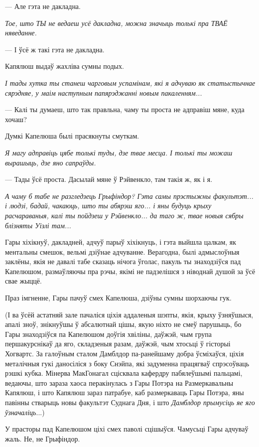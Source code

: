 --- Але гэта не дакладна.

\emph{Тое, што ТЫ не ведаеш усё дакладна, можна значыць толькі пра ТВАЁ
няведанне.}

--- І ўсё ж такі гэта не дакладна.

Капялюш выдаў жахліва сумны подых.

\emph{І тады хутка ты станеш чарговым успамінам, які я адчуваю як статыстычнае
сярэдняе, у маім наступным папярэджанні новым пакаленням...}

--- Калі ты думаеш, што так правльна, чаму ты проста не адправіш мяне, куда хочаш?

Думкі Капелюша былі прасякнуты смуткам.

\emph{Я магу адправіць цябе толькі туды, дзе твае месца. І толькі ты можаш вырашыць, дзе
яно сапраўды.}

--- Тады ўсё проста. Дасылай мяне ў Рэйвенкло, там такія ж, як і я.

\emph{А чаму б табе не разгледзець Грыфіндор? Гэта самы прэстыжны факультэт...
і людзі, бадай, чакаюць, што ты абярэш яго... і яны будуць крыху расчараваныя, 
калі ты пойдзеш у   Рэйвенкло... да таго ж, твае новыя сябры блізняты Уізлі там...}

Гары хіхікнуў, дакладней, адчуў парыў хіхікнуць, і гэта выйшла цалкам, як 
ментальны смешок, вельмі дзіўнае адчуванне. Верагодна, былі адмыслоўныя заклёны,
якія не давалі табе сказаць нічога ўголас, пакуль ты знаходзіўся пад Капелюшом,
размаўляючы пра рэчы, якімі не падзелішся з ніводнай душой за ўсё свае жыццё.

Праз імгненне, Гары пачуў смех Капелюша, дзіўны сумны шорхаючы гук.

(І ва ўсёй астатняй зале пачаліся ціхія аддаленыя шэпты,
якія, крыху ўзняўшыся, апалі зноў, знікнуўшы ў абсалютнай цішы, якую ніхто 
не смеў парушыць, бо Гары знаходзіўся па Капелюшом доўгія хвіліны, даўжэй,
чым група першакурснікаў да яго, складзеныя разам, даўжэй, чым хтосьці ў 
гісторыі Хогвартс. За галоўным сталом Дамблдор па-ранейшаму добра ўсміхаўся,
ціхія металічныя гукі даносіліся з боку Снэйпа, які задуменна працягваў спрэсоўваць
рэшкі кубка. Мінерва МакГонагал сцісквала кафердру пабялеўшымі пальцамі, ведаючы,
што зараза хаоса перакінулась з Гары Потэра на Размеркавальны Капялюш,
і што Капялюш зараз патрабуе, каб размеркаваць Гары Потэра, яны павінны стварыць
новы факультэт Суднага Дня, і што \emph{Дамблдор прымусіць яе яго ўзначаліць}...)

У прасторы пад Капелюшом ціхі смех паволі сцішыўся. Чамусьці Гары адчуваў жаль.
Не, не Грыфіндор.

